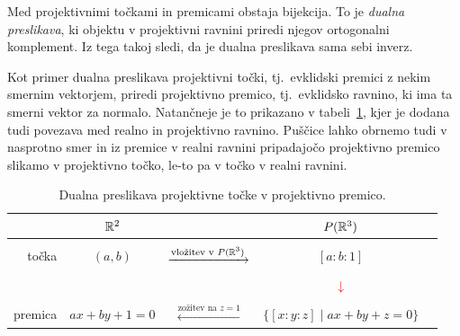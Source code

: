 
Med projektivnimi točkami in premicami obstaja bijekcija. To je \emph{dualna preslikava}, ki objektu v projektivni ravnini priredi njegov ortogonalni komplement. Iz tega takoj sledi, da je dualna preslikava sama sebi inverz.

Kot primer dualna preslikava projektivni točki, tj.\ evklidski premici z nekim smernim vektorjem, priredi projektivno premico, tj.\ evklidsko ravnino, ki ima ta smerni vektor za normalo. Natančneje je to prikazano v tabeli~\ref{tab:dualna_preslikava}, kjer je dodana tudi povezava med realno in projektivno ravnino. Puščice lahko obrnemo tudi v nasprotno smer in iz premice v realni ravnini pripadajočo projektivno premico slikamo v projektivno točko, le-to pa v točko v realni ravnini.

\begin{table}[h!]
    \begin{center}
    \begin{tabular}{r|cccc}
    & $\mathbb R^2$ & & $P(\mathbb R^3)$ \\
    \hline \\
    točka & $(a,b)$ & $\xrightarrow{\text{vložitev v } P(\mathbb R^3)}$ & $[a : b : 1] $ \\
    & & & \\
    & &  & \textcolor{red}{$\downarrow$} \\
    & & & \\
    premica & $ ax + by + 1 = 0$ & $\xleftarrow{\text{zožitev na } z = 1} $ & $\{ [x:y:z] \; | \; ax+by+z = 0 \} $
    \end{tabular}
    \end{center}
    \caption{Dualna preslikava projektivne točke v projektivno premico.}
    \label{tab:dualna_preslikava}
\end{table}

